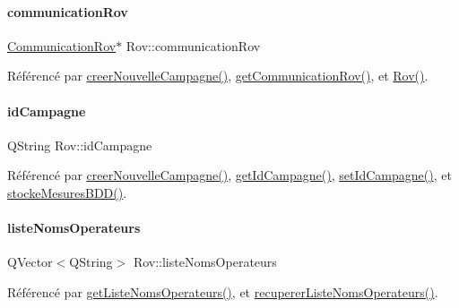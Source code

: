 \paragraph{\texorpdfstring{communication\+Rov}{communicationRov}}
{\footnotesize\ttfamily \hyperlink{class_communication_rov}{Communication\+Rov}$\ast$ Rov\+::communication\+Rov\hspace{0.3cm}{\ttfamily [private]}}



Référencé par \hyperlink{class_rov_ae1306036b067e9ad50a09f9dd607a092}{creer\+Nouvelle\+Campagne()}, \hyperlink{class_rov_ad30543625f584e28bf785a80c59506dc}{get\+Communication\+Rov()}, et \hyperlink{class_rov_a5dddd3bd156c134848078296087d090c}{Rov()}.

\mbox{\label{class_rov_aaaed58cd7ee9edbeab5251cd413a1bae}} 
\paragraph{\texorpdfstring{id\+Campagne}{idCampagne}}
{\footnotesize\ttfamily Q\+String Rov\+::id\+Campagne\hspace{0.3cm}{\ttfamily [private]}}



Référencé par \hyperlink{class_rov_ae1306036b067e9ad50a09f9dd607a092}{creer\+Nouvelle\+Campagne()}, \hyperlink{class_rov_aaf98d93ef9b164a2e1766494d9577b57}{get\+Id\+Campagne()}, \hyperlink{class_rov_a9bbaec4a59dae307440bfeefbc56190b}{set\+Id\+Campagne()}, et \hyperlink{class_rov_adab08abfde381c2915695489b34da6b4}{stocke\+Mesures\+B\+D\+D()}.

\mbox{\label{class_rov_a3d424033e0ff00f480a711358ef4fde6}} 
\paragraph{\texorpdfstring{liste\+Noms\+Operateurs}{listeNomsOperateurs}}
{\footnotesize\ttfamily Q\+Vector$<$Q\+String$>$ Rov\+::liste\+Noms\+Operateurs\hspace{0.3cm}{\ttfamily [private]}}



Référencé par \hyperlink{class_rov_ab585cb1f82344ba0a64a28488910b262}{get\+Liste\+Noms\+Operateurs()}, et \hyperlink{class_rov_a490eefb90bf28e83f181d770f0f52446}{recuperer\+Liste\+Noms\+Operateurs()}.

